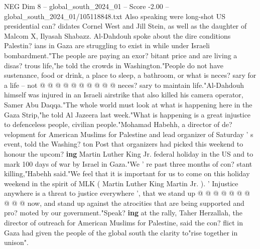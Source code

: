 \begin{textsample}{NEG Dim 8 – global\_south\_2024\_01 – Score -2.00 – global\_south\_2024\_01/105118848.txt}
Also speaking were long-shot US presidential can? didates Cornel West and Jill Stein, as well as the daughter of Malcom X, Ilyasah Shabazz.
Al-Dahdouh spoke about the dire conditions Palestin? ians in Gaza are struggling to exist in while under Israeli bombardment."The people are paying an exor? bitant price and are living a disas? trous life,"he told the crowds in Washington."People do not have sustenance, food or drink, a place to sleep, a bathroom, or what is neces? sary for a life -- not @ @ @ @ @ @ @ @ @ @ neces? sary to maintain life."Al-Dahdouh himself was injured in an Israeli airstrike that also killed his camera operator, Samer Abu Daqqa."The whole world must look at what is happening here in the Gaza Strip,"he told Al Jazeera last week."What is happening is a great injustice to defenceless people, civilian people."Mohamad Habehh, a director of de? velopment for American Muslims for Palestine and lead organizer of Saturday ' s event, told the Washing? ton Post that organizers had picked this weekend to honour the upcom? \textbf{ing} Martin Luther King Jr. federal holiday in the US and to mark 100 days of war by Israel in Gaza."We ' re past three months of con? stant killing,"Habehh said."We feel that it is important for us to come on this holiday weekend in the spirit of MLK ( Martin Luther King Martin Jr. ). ' Injustice anywhere is a threat to justice everywhere ', that we stand up @ @ @ @ @ @ @ @ @ @ now, and stand up against the atrocities that are being supported and pro? moted by our government."Speak? \textbf{ing} at the rally, Taher Herzallah, the director of outreach for American Muslims for Palestine, said the con? flict in Gaza had given the people of the global south the clarity to"rise together in unison".

\end{textsample}

